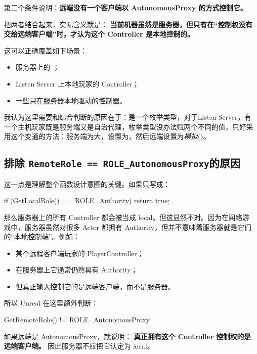 \begin{enumerate}
	第二个条件说明：\textbf{远端没有一个客户端以 AutonomousProxy 的方式控制它。}
	
	把两者结合起来，实际含义就是：	\textbf{当前机器虽然是服务器，但只有在“控制权没有交给远端客户端”时，才认为这个 Controller 是本地控制的。}
	
	这可以正确覆盖如下场景：
	
	\begin{itemize}
		\item 服务器上的 ；
		\item Listen Server 上本地玩家的 Controller；
		\item 一些只在服务器本地驱动的控制器。
	\end{itemize}
	\begin{marker}\small
		我认为这里需要和结合判断的原因在于：是一个枚举类型，对于Listen Server，有一个主机玩家既是服务端又是自治代理，枚举类型没办法赋两个不同的值，只好采用这个变通的方法：服务端为大，设置为，然后远端设置为\emph{模拟}()。
	\end{marker}
\end{enumerate}

\subsection{排除 \texttt{RemoteRole == ROLE\_AutonomousProxy}的原因}
这一点是理解整个函数设计意图的关键。如果只写成：
\begin{code}
	if (GetLocalRole() == ROLE_Authority)
	{
		return true;
	}
\end{code}

那么服务器上的所有 Controller 都会被当成 local。但这显然不对。因为在网络游戏中，服务器虽然对很多 Actor 都拥有 Authority，但并不意味着服务器就是它们的“本地控制端”。例如：
\begin{itemize}
	\item 某个远程客户端玩家的 PlayerController；
	\item 在服务器上它通常仍然具有 Authority；
	\item 但真正输入控制它的是远端客户端，而不是服务器。
\end{itemize}

所以 Unreal 在这里额外判断：
\begin{code}
	GetRemoteRole() != ROLE_AutonomousProxy
\end{code}
如果远端是 AutonomousProxy，就说明：	\textbf{真正拥有这个 Controller 控制权的是远端客户端。}
因此服务器不应把它认定为 local。

